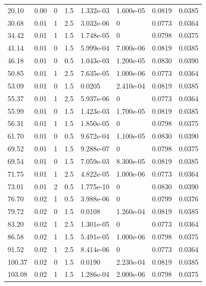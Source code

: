 \documentclass[preview]{standalone}
\begin{document}
{{\begin{tabular}{L{1.2cm}C{1.2cm} C{0.3cm}C{0.5cm} C{1.4cm}C{1.4cm} C{1.4cm}C{1.4cm}}
  20.10  &  0.00  & 0     & 1.5 &  1.332e-03  & 1.600e-05  & 0.0819 &  0.0385   \\ 
  30.68  &  0.01  & 1     & 2.5 &  3.032e-06  & 0  & 0.0773 &  0.0364   \\ 
  34.42  &  0.01  & 1     & 1.5 &  1.748e-05  & 0  & 0.0798 &  0.0375   \\ 
  41.14  &  0.01  & 0     & 1.5 &  5.999e-04  & 7.000e-06  & 0.0819 &  0.0385   \\ 
  46.18  &  0.01  & 0     & 0.5 &  1.043e-03  & 1.200e-05  & 0.0830 &  0.0390   \\ 
  50.85  &  0.01  & 1     & 2.5 &  7.635e-05  & 1.000e-06  & 0.0773 &  0.0364   \\ 
  53.09  &  0.01  & 0     & 1.5 &  0.0205  & 2.410e-04  & 0.0819 &  0.0385   \\ 
  55.37  &  0.01  & 1     & 2.5 &  5.937e-06  & 0  & 0.0773 &  0.0364   \\ 
  55.99  &  0.01  & 0     & 1.5 &  1.423e-03  & 1.700e-05  & 0.0819 &  0.0385   \\ 
  56.31  &  0.01  & 1     & 1.5 &  1.850e-05  & 0  & 0.0798 &  0.0375   \\ 
  61.70  &  0.01  & 0     & 0.5 &  9.672e-04  & 1.100e-05  & 0.0830 &  0.0390   \\ 
  69.52  &  0.01  & 1     & 1.5 &  9.288e-07  & 0  & 0.0798 &  0.0375   \\ 
  69.54  &  0.01  & 0     & 1.5 &  7.059e-03  & 8.300e-05  & 0.0819 &  0.0385   \\ 
  71.75  &  0.01  & 1     & 2.5 &  4.822e-05  & 1.000e-06  & 0.0773 &  0.0364   \\ 
  73.01  &  0.01  & 2     & 0.5 &  1.775e-10  & 0  & 0.0830 &  0.0390   \\ 
  76.70  &  0.02  & 1     & 0.5 &  3.988e-06  & 0  & 0.0799 &  0.0376   \\ 
  79.72  &  0.02  & 0     & 1.5 &  0.0108  & 1.260e-04  & 0.0819 &  0.0385   \\ 
  83.20  &  0.02  & 1     & 2.5 &  1.301e-05  & 0  & 0.0773 &  0.0364   \\ 
  86.58  &  0.02  & 1     & 1.5 &  5.491e-05  & 1.000e-06  & 0.0798 &  0.0375   \\ 
  91.52  &  0.02  & 1     & 2.5 &  8.414e-06  & 0  & 0.0773 &  0.0364   \\ 
  100.37  &  0.02  & 0     & 1.5 &  0.0190  & 2.230e-04  & 0.0819 &  0.0385   \\ 
  103.08  &  0.02  & 1     & 1.5 &  1.286e-04  & 2.000e-06  & 0.0798 &  0.0375   \\ 

\end{tabular}}}
\end{document}
